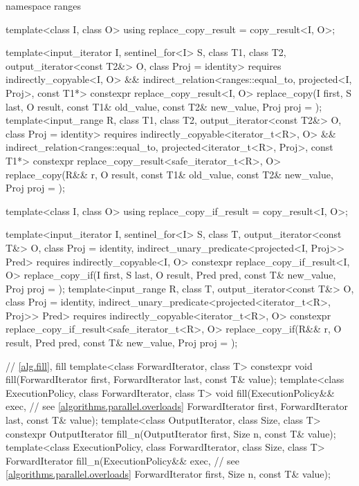 \begin{codeblock}
{  namespace ranges {
    template<class I, class O>
    using replace_copy_result = copy_result<I, O>;

    template<input_iterator I, sentinel_for<I> S, class T1, class T2,
             output_iterator<const T2&> O, class Proj = identity>
      requires indirectly_copyable<I, O> &&
               indirect_relation<ranges::equal_to, projected<I, Proj>, const T1*>
      constexpr replace_copy_result<I, O>
        replace_copy(I first, S last, O result, const T1& old_value, const T2& new_value,
                     Proj proj = {});
    template<input_range R, class T1, class T2, output_iterator<const T2&> O,
             class Proj = identity>
      requires indirectly_copyable<iterator_t<R>, O> &&
               indirect_relation<ranges::equal_to, projected<iterator_t<R>, Proj>, const T1*>
      constexpr replace_copy_result<safe_iterator_t<R>, O>
        replace_copy(R&& r, O result, const T1& old_value, const T2& new_value,
                     Proj proj = {});

    template<class I, class O>
    using replace_copy_if_result = copy_result<I, O>;

    template<input_iterator I, sentinel_for<I> S, class T, output_iterator<const T&> O,
             class Proj = identity, indirect_unary_predicate<projected<I, Proj>> Pred>
      requires indirectly_copyable<I, O>
      constexpr replace_copy_if_result<I, O>
        replace_copy_if(I first, S last, O result, Pred pred, const T& new_value,
                        Proj proj = {});
    template<input_range R, class T, output_iterator<const T&> O, class Proj = identity,
             indirect_unary_predicate<projected<iterator_t<R>, Proj>> Pred>
      requires indirectly_copyable<iterator_t<R>, O>
      constexpr replace_copy_if_result<safe_iterator_t<R>, O>
        replace_copy_if(R&& r, O result, Pred pred, const T& new_value,
                        Proj proj = {});
  }

  // \ref{alg.fill}, fill
  template<class ForwardIterator, class T>
    constexpr void fill(ForwardIterator first, ForwardIterator last, const T& value);
  template<class ExecutionPolicy, class ForwardIterator, class T>
    void fill(ExecutionPolicy&& exec,                           // see \ref{algorithms.parallel.overloads}
              ForwardIterator first, ForwardIterator last, const T& value);
  template<class OutputIterator, class Size, class T>
    constexpr OutputIterator fill_n(OutputIterator first, Size n, const T& value);
  template<class ExecutionPolicy, class ForwardIterator,
           class Size, class T>
    ForwardIterator fill_n(ExecutionPolicy&& exec,              // see \ref{algorithms.parallel.overloads}
                           ForwardIterator first, Size n, const T& value);

}
\end{codeblock}
